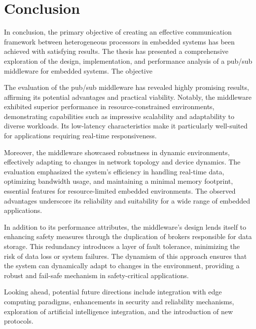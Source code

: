 

\chapter*{Conclusion}

In conclusion, the primary objective of creating an effective communication framework between heterogeneous processors in embedded systems has been achieved with satisfying results.
The thesis has presented a comprehensive exploration of the design, implementation, and performance analysis of a pub/sub middleware for embedded systems.
The objective 

The evaluation of the pub/sub middleware has revealed highly promising results, affirming its potential advantages and practical viability. Notably, the middleware exhibited superior performance in resource-constrained environments, demonstrating capabilities such as impressive scalability and adaptability to diverse workloads. Its low-latency characteristics make it particularly well-suited for applications requiring real-time responsiveness.

Moreover, the middleware showcased robustness in dynamic environments, effectively adapting to changes in network topology and device dynamics. The evaluation emphasized the system's efficiency in handling real-time data, optimizing bandwidth usage, and maintaining a minimal memory footprint, essential features for resource-limited embedded environments. The observed advantages underscore its reliability and suitability for a wide range of embedded applications.

In addition to its performance attributes, the middleware's design lends itself to enhancing safety measures through the duplication of brokers responsible for data storage. This redundancy introduces a layer of fault tolerance, minimizing the risk of data loss or system failures. The dynamism of this approach ensures that the system can dynamically adapt to changes in the environment, providing a robust and fail-safe mechanism in safety-critical applications.

Looking ahead, potential future directions include integration with edge computing paradigms, enhancements in security and reliability mechanisms, exploration of artificial intelligence integration, and the introduction of new protocols.